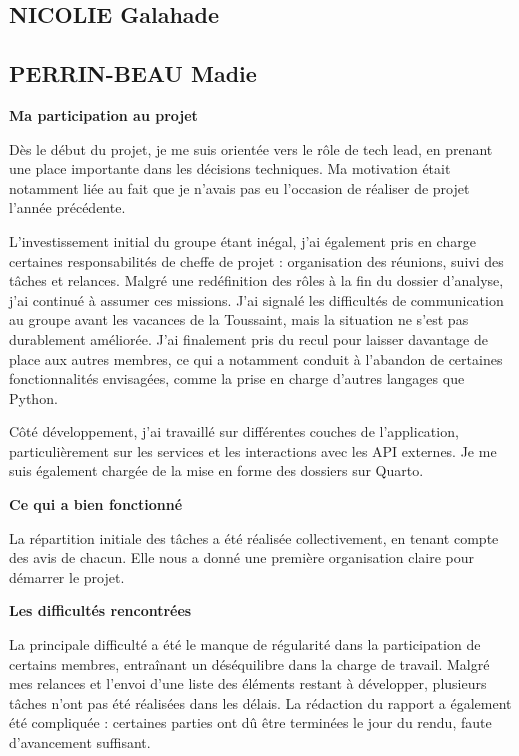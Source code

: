 \documentclass[a4paper,12pt]{article}
\begin{document}
\newpage{}

\subsection*{NICOLIE Galahade}\label{nicolie-galahade}

\newpage{}

\subsection*{PERRIN-BEAU Madie}\label{perrin-beau-madie}

\textbf{Ma participation au projet}

Dès le début du projet, je me suis orientée vers le rôle de tech lead,
en prenant une place importante dans les décisions techniques. Ma
motivation était notamment liée au fait que je n'avais pas eu l'occasion
de réaliser de projet l'année précédente.

L'investissement initial du groupe étant inégal, j'ai également pris en
charge certaines responsabilités de cheffe de projet : organisation des
réunions, suivi des tâches et relances. Malgré une redéfinition des
rôles à la fin du dossier d'analyse, j'ai continué à assumer ces
missions. J'ai signalé les difficultés de communication au groupe avant
les vacances de la Toussaint, mais la situation ne s'est pas durablement
améliorée. J'ai finalement pris du recul pour laisser davantage de place
aux autres membres, ce qui a notamment conduit à l'abandon de certaines
fonctionnalités envisagées, comme la prise en charge d'autres langages
que Python.

Côté développement, j'ai travaillé sur différentes couches de
l'application, particulièrement sur les services et les interactions
avec les API externes. Je me suis également chargée de la mise en forme
des dossiers sur Quarto.

\textbf{Ce qui a bien fonctionné}

La répartition initiale des tâches a été réalisée collectivement, en
tenant compte des avis de chacun. Elle nous a donné une première
organisation claire pour démarrer le projet.

\textbf{Les difficultés rencontrées}

La principale difficulté a été le manque de régularité dans la
participation de certains membres, entraînant un déséquilibre dans la
charge de travail. Malgré mes relances et l'envoi d'une liste des
éléments restant à développer, plusieurs tâches n'ont pas été réalisées
dans les délais. La rédaction du rapport a également été compliquée :
certaines parties ont dû être terminées le jour du rendu, faute
d'avancement suffisant.
\end{document}
